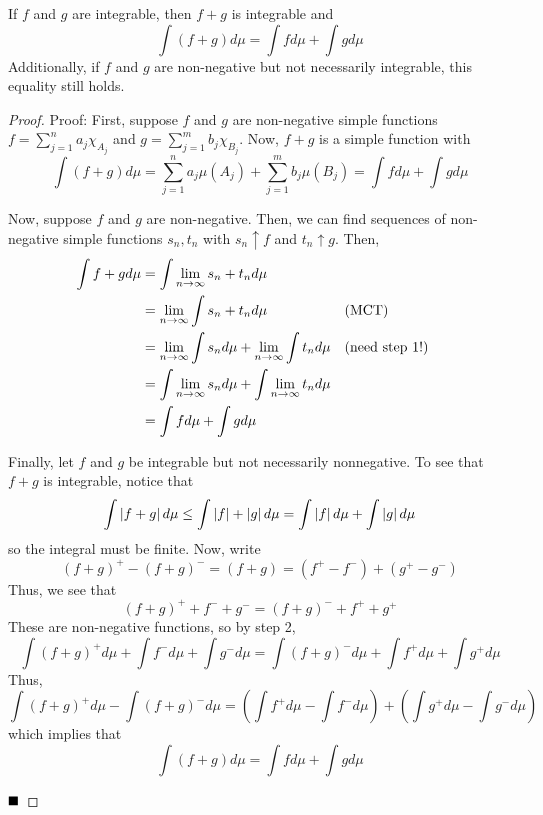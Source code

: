 \begin{lemma}
    If $f$ and $g$ are integrable, then $f + g$ is integrable and
    \[ \int (f + g) d\mu = \int f d\mu + \int g d\mu \]
    Additionally, if $f$ and $g$ are non-negative but not necessarily integrable, this equality still holds. 
\end{lemma}
\begin{proof}{Proof:}
    First, suppose $f$ and $g$ are non-negative simple functions $f = \sum_{j = 1}^{n} a_j \chi_{A_j}$ and $g = \sum_{j = 1}^{m} b_j\chi_{B_j}$. Now, $f + g$ is a simple function with
    \[ \int (f + g)d\mu = \sum_{j = 1}^{n}a_j\mu(A_j) + \sum_{j = 1}^{m} b_j\mu(B_j) = \int f d\mu + \int g d\mu \]

    Now, suppose $f$ and $g$ are non-negative. Then, we can find sequences of non-negative simple functions $s_n, t_n$ with $s_n \uparrow f$ and $t_n \uparrow g$. Then, 
    \begin{align*}
        \int f + g d\mu &= \int \lim_{n \to \infty} s_n + t_n d\mu\\
        &= \lim_{n \to \infty} \int s_n + t_n d\mu && (\tt{MCT})\\
        &= \lim_{n \to \infty} \int s_n d\mu + \lim_{n \to \infty} \int t_n d\mu && (\tt{need step 1!})\\
        &= \int \lim_{n \to \infty} s_n d\mu + \int \lim_{n \to \infty} t_n d\mu\\
        &= \int f d\mu + \int g d\mu
    \end{align*}

    Finally, let $f$ and $g$ be integrable but not necessarily nonnegative. To see that $f + g$ is integrable, notice that
    \[ \int \abs{f + g}d\mu \leq \int \abs{f} + \abs{g}d\mu = \int \abs{f} d\mu + \int \abs{g}d\mu \]
    so the integral must be finite. Now, write
    \[ (f + g)^{+} - (f + g)^{-} = (f + g) = (f^{+} - f^{-})  + (g^{+} - g^{-}) \]
    Thus, we see that
    \[ (f + g)^{+} + f^{-} + g^{-} = (f + g)^{-} + f^{+} + g^{+} \]
    These are non-negative functions, so by step 2,
    \[ \int (f + g)^{+}d\mu + \int f^{-}d\mu + \int g^{-}d\mu = \int (f + g)^{-}d\mu + \int f^{+}d\mu + \int g^{+}d\mu \]
    Thus,
    \[ \int (f + g)^{+}d\mu - \int (f + g)^{-}d\mu = \left(\int f^{+}d\mu - \int f^{-}d\mu\right) + \left(\int g^{+}d\mu - \int g^{-}d\mu\right) \]
    which implies that
    \[ \int (f + g)d\mu = \int f d\mu + \int g d\mu \]

    $\qed$
\end{proof}


